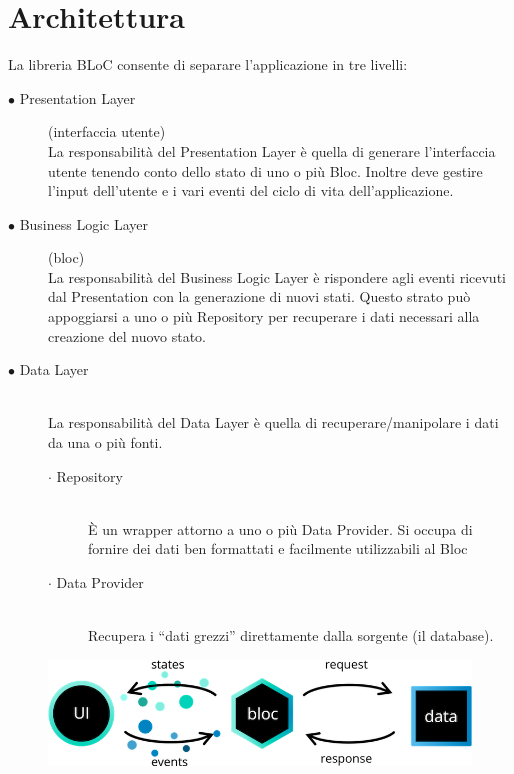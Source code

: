\documentclass[a4paper, oneside, 12pt]{book}
\begin{document}
\newpage
\section{Architettura}
La libreria BLoC consente di separare l'applicazione in tre livelli:

\begin{description}
	\item [$\bullet$ Presentation Layer] (interfaccia utente) \hfill \\
	La responsabilità del Presentation Layer è quella di generare l'interfaccia utente tenendo conto dello stato di uno o più Bloc. 
	Inoltre deve gestire l'input dell'utente e i vari eventi del ciclo di vita dell'applicazione.
	\item [$\bullet$ Business Logic Layer] (bloc) \hfill \\
	La responsabilità del Business Logic Layer è rispondere agli eventi ricevuti dal Presentation con la generazione di nuovi stati. 
	Questo strato può appoggiarsi a uno o più Repository per recuperare i dati necessari alla creazione del nuovo stato.
	\item [$\bullet$ Data Layer] \hfill \\
	La responsabilità del Data Layer è quella di recuperare/manipolare i dati da una o più fonti.
	\begin{description}
		\item [$\cdot$ Repository] \hfill \\ 
		È un wrapper attorno a uno o più Data Provider. Si occupa di fornire dei dati ben formattati e facilmente utilizzabili al Bloc
		\item [$\cdot$ Data Provider] \hfill \\
		Recupera i “dati grezzi” direttamente dalla sorgente (il database).
	\end{description}
\end{description}

\begin{figure}[H]
	\centering
	\includegraphics[width = 12 cm]{images/bloc_architecture.png}
	\label{fig:Architettura BLoC}
\end{figure}

\newpage
{}
\end{document}
